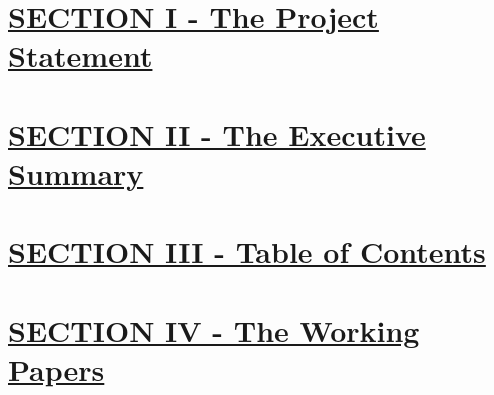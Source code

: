 \documentclass[11pt,a4paper,numbers=noenddot]{scrartcl}
\begin{document}


\section{\underline{SECTION I - The Project Statement}}
\section{\underline{SECTION II - The Executive Summary}}
\newpage
\section{\underline{SECTION III - Table of Contents}}
\tableofcontents
\newpage
\section{\underline{SECTION IV - The Working Papers}}
\end{document}
